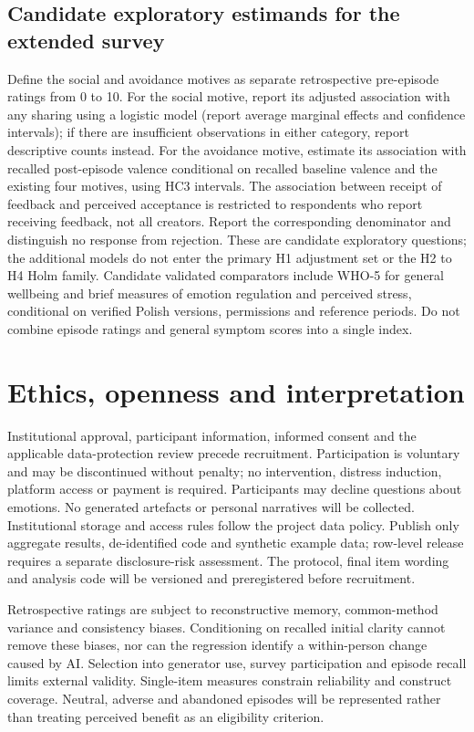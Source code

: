 \documentclass[11pt,a4paper]{article}
\begin{document}
\subsection{Candidate exploratory estimands for the extended survey}
Define the social and avoidance motives as separate retrospective pre-episode ratings from 0 to 10. For the social motive, report its adjusted association with any sharing using a logistic model (report average marginal effects and confidence intervals); if there are insufficient observations in either category, report descriptive counts instead. For the avoidance motive, estimate its association with recalled post-episode valence conditional on recalled baseline valence and the existing four motives, using HC3 intervals. The association between receipt of feedback and perceived acceptance is restricted to respondents who report receiving feedback, not all creators. Report the corresponding denominator and distinguish no response from rejection. These are candidate exploratory questions; the additional models do not enter the primary H1 adjustment set or the H2 to H4 Holm family. Candidate validated comparators include WHO-5 for general wellbeing and brief measures of emotion regulation and perceived stress, conditional on verified Polish versions, permissions and reference periods. Do not combine episode ratings and general symptom scores into a single index.

\section{Ethics, openness and interpretation}
Institutional approval, participant information, informed consent and the applicable data-protection review precede recruitment. Participation is voluntary and may be discontinued without penalty; no intervention, distress induction, platform access or payment is required. Participants may decline questions about emotions. No generated artefacts or personal narratives will be collected. Institutional storage and access rules follow the project data policy. Publish only aggregate results, de-identified code and synthetic example data; row-level release requires a separate disclosure-risk assessment. The protocol, final item wording and analysis code will be versioned and preregistered before recruitment.

Retrospective ratings are subject to reconstructive memory, common-method variance and consistency biases. Conditioning on recalled initial clarity cannot remove these biases, nor can the regression identify a within-person change caused by AI. Selection into generator use, survey participation and episode recall limits external validity. Single-item measures constrain reliability and construct coverage. Neutral, adverse and abandoned episodes will be represented rather than treating perceived benefit as an eligibility criterion.
\end{document}
